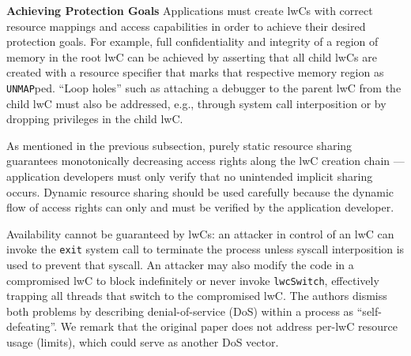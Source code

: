 \documentclass[10pt,twocolumn,a4paper]{article}
\begin{document}
\textbf{Achieving Protection Goals}\hspace{1em}
Applications must create lwCs with correct resource mappings and access capabilities in order to achieve their desired protection goals.
For example, full confidentiality and integrity of a region of memory in the root lwC can be achieved by asserting that all child lwCs are created with a resource specifier that marks that respective memory region as \lstinline{UNMAP}ped.
\enquote{Loop holes} such as attaching a debugger to the parent lwC from the child lwC must also be addressed, e.g., through system call interposition or by dropping privileges in the child lwC.

As mentioned in the previous subsection, purely static resource sharing guarantees monotonically decreasing access rights along the lwC creation chain ---
application developers must only verify that no unintended implicit sharing occurs.
Dynamic resource sharing should be used carefully because the dynamic flow of access rights can only and must be verified by the application developer.
\cite{lwcpaper}

Availability cannot be guaranteed by lwCs:
an attacker in control of an lwC can invoke the \lstinline{exit} system call to terminate the process unless syscall interposition is used to prevent that syscall.
An attacker may also modify the code in a compromised lwC to block indefinitely or never invoke \lstinline{lwcSwitch}, effectively trapping all threads that switch to the compromised lwC.
The authors dismiss both problems by describing denial-of-service (DoS) within a process as \enquote{self-defeating}.
We remark that the original paper does not address per-lwC resource usage (limits), which could serve as another DoS vector. 
\cite{lwcpaper}



\end{document}
